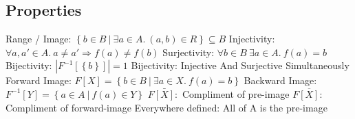 \documentclass[12pt]{article}
\begin{document}
\subsection{Properties}
Range / Image: \begin{math}\left \{ b \in B\ |\ \exists a \in A.\ \left ( a,b \right ) \in R \right \}\subseteq B\end{math}\newline\newline
Injectivity: \begin{math}\forall a,a'\in A.\ a\neq a' \Rightarrow f\left ( a \right )\neq f\left ( b \right )\end{math}\newline\newline
Surjectivity: \begin{math}\forall b \in B\ \exists a \in A.\ f\left ( a \right )=b\end{math}\newline\newline
Bijectivity: \begin{math}|F^{-1}\left [ \left \{ b \right \} \right ]| = 1\end{math}\newline\newline
Bijectivity: Injective And Surjective Simultaneously\newline\newline
Forward Image: \begin{math}F\left [ X \right ]=\left \{ b\in B\ |\ \exists a \in X.\ f\left ( a \right )=b \right \}\end{math}\newline\newline
Backward Image: \begin{math}F^{-1}\left [ Y \right ]=\left \{ a\in A\ |\ f\left ( a \right )\in Y \right \}\end{math}\newline\newline
\begin{math}F\bar{\left [ X \right ]}:\end{math} Compliment of pre-image\newline\newline
\begin{math}F\overline{\left [X \right ]}:\end{math} Compliment of forward-image\newline\newline
Everywhere defined: All of A is the pre-image\newpage
\end{document}
